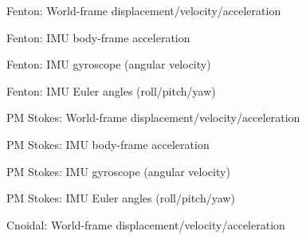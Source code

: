 \documentclass[11pt,letterpaper]{article}
\begin{document}
\begin{figure}[H]\centering
  \resizebox{\textwidth}{!}{}
  \caption{Fenton: World-frame displacement/velocity/acceleration}
  \label{fig:fenton_world}
\end{figure}
\clearpage

\begin{figure}[H]\centering
  \resizebox{\textwidth}{!}{}
  \caption{Fenton: IMU body-frame acceleration}
  \label{fig:fenton_imu_accel}
\end{figure}
\clearpage

\begin{figure}[H]\centering
  \resizebox{\textwidth}{!}{}
  \caption{Fenton: IMU gyroscope (angular velocity)}
  \label{fig:fenton_imu_gyro}
\end{figure}
\clearpage

\begin{figure}[H]\centering
  \resizebox{\textwidth}{!}{}
  \caption{Fenton: IMU Euler angles (roll/pitch/yaw)}
  \label{fig:fenton_euler}
\end{figure}
\clearpage

\begin{figure}[H]\centering
  \resizebox{\textwidth}{!}{}
  \caption{PM Stokes: World-frame displacement/velocity/acceleration}
  \label{fig:pmstokes_world}
\end{figure}
\clearpage

\begin{figure}[H]\centering
  \resizebox{\textwidth}{!}{}
  \caption{PM Stokes: IMU body-frame acceleration}
  \label{fig:pmstokes_imu_accel}
\end{figure}
\clearpage

\begin{figure}[H]\centering
  \resizebox{\textwidth}{!}{}
  \caption{PM Stokes: IMU gyroscope (angular velocity)}
  \label{fig:pmstokes_imu_gyro}
\end{figure}
\clearpage

\begin{figure}[H]\centering
  \resizebox{\textwidth}{!}{}
  \caption{PM Stokes: IMU Euler angles (roll/pitch/yaw)}
  \label{fig:pmstokes_euler}
\end{figure}
\clearpage

\begin{figure}[H]\centering
  \resizebox{\textwidth}{!}{}
  \caption{Cnoidal: World-frame displacement/velocity/acceleration}
  \label{fig:cnoidal_world}
\end{figure}
\clearpage
\end{document}
